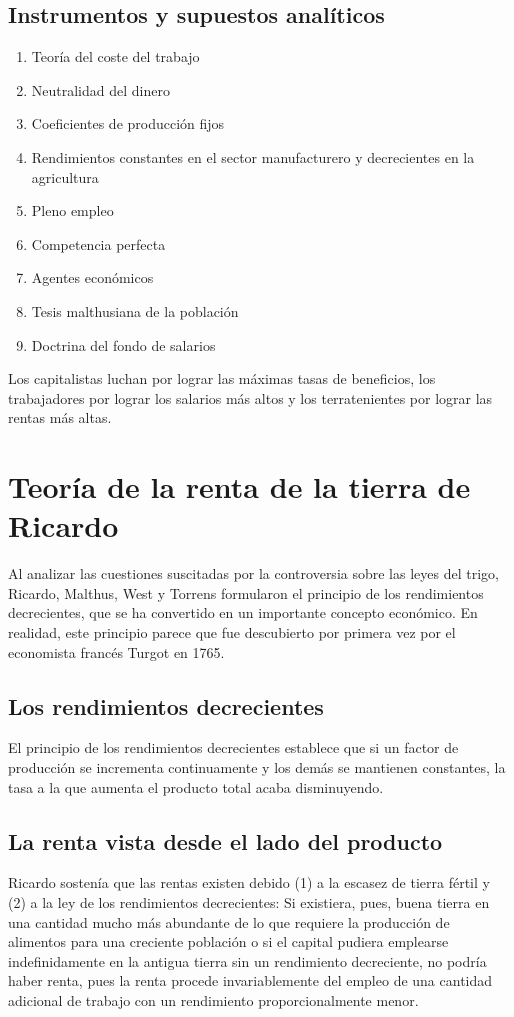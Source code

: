 \documentclass[10pt]{book}
\begin{document}
\subsection*{Instrumentos y supuestos analíticos}
\begin{enumerate}
    \item  Teoría del coste del trabajo
    \item Neutralidad del dinero
    \item Coeficientes de producción fijos
    \item Rendimientos constantes en el sector manufacturero y decrecientes en la agricultura
    \item Pleno empleo
    \item Competencia perfecta
    \item Agentes económicos
    \item Tesis malthusiana de la población
    \item Doctrina del fondo de salarios
\end{enumerate}
Los capitalistas luchan por lograr las máximas tasas de beneficios, los
trabajadores por lograr los salarios más altos y los terratenientes por lograr las rentas
más altas.

\section*{Teoría de la renta de la tierra de Ricardo}
Al analizar las cuestiones suscitadas por la controversia sobre las leyes del trigo, Ricardo, Malthus, West y Torrens formularon el principio de los rendimientos decrecientes, que se ha convertido en un importante concepto económico. En realidad, este principio parece que fue descubierto por primera vez por el economista francés Turgot en 1765.

\subsection*{Los rendimientos decrecientes}
El principio de los rendimientos decrecientes establece que si un factor de producción se incrementa continuamente y los demás se mantienen constantes, la tasa a la que aumenta el producto total acaba disminuyendo.\\

\subsection*{La renta vista desde el lado del producto}
Ricardo sostenía que las rentas existen debido (1) a la escasez de tierra fértil y (2) a la ley de los rendimientos decrecientes:
Si existiera, pues, buena tierra en una cantidad mucho más abundante de lo que requiere la producción de alimentos para una creciente población o si el capital pudiera emplearse indefinidamente en la antigua tierra sin un rendimiento decreciente, no podría haber renta, pues la renta procede invariablemente del empleo de una cantidad adicional de trabajo con un rendimiento proporcionalmente menor.
\end{document}
